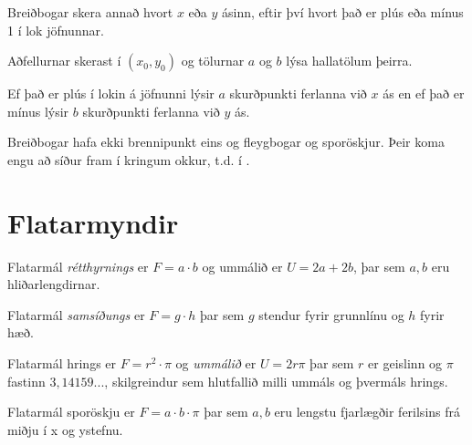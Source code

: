 \documentclass[a4paper,10pt,icelandic]{sphinxmanual}
\begin{document}
Breiðbogar skera annað hvort \(x\) eða \(y\) \sphinxhyphen{}ásinn, eftir því hvort það er plús eða mínus 1 í lok jöfnunnar.

Aðfellurnar skerast í  \((x_0,y_0)\) og tölurnar \(a\) og \(b\) lýsa hallatölum þeirra.

Ef það er plús í lokin á jöfnunni lýsir \(a\) skurðpunkti ferlanna við \(x\) \sphinxhyphen{} ás en ef það er mínus lýsir \(b\) skurðpunkti ferlanna við \(y\) \sphinxhyphen{} ás.

Breiðbogar hafa ekki brennipunkt eins og fleygbogar og sporöskjur.
Þeir koma engu að síður fram í kringum okkur, t.d. í  .


\section{Flatarmyndir}
\label{\detokenize{Kafli03:flatarmyndir}}
Flatarmál \textit{rétthyrnings} er \(F=a\cdot b\) og ummálið er \(U=2a+2b\), þar sem \(a, b\) eru hliðarlengdirnar.

\begin{figure}[htbp]
\centering

\noindent{}
\end{figure}

Flatarmál \textit{samsíðungs} er \(F=g\cdot h\) þar sem \(g\) stendur fyrir grunnlínu og \(h\) fyrir hæð.

\begin{figure}[htbp]
\centering

\noindent{}
\end{figure}

Flatarmál hrings er \(F=r^2\cdot\pi\) og \textit{ummálið} er \(U=2r\pi\) þar sem \(r\) er geislinn og \(\pi\) fastinn \(3,14159...\), skilgreindur sem hlutfallið milli ummáls og þvermáls hrings.

\begin{figure}[htbp]
\centering

\noindent{}
\end{figure}

Flatarmál sporöskju er \(F=a\cdot b\cdot\pi\) þar sem \(a, b\) eru lengstu fjarlægðir ferilsins frá miðju í x\sphinxhyphen{} og y\sphinxhyphen{}stefnu.

\begin{figure}[htbp]
\centering

\noindent{}
\end{figure}
\end{document}
